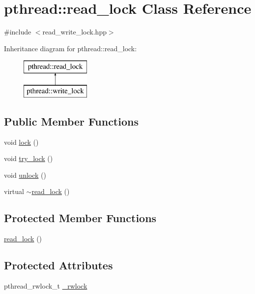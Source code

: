 \hypertarget{classpthread_1_1read__lock}{\section{pthread\+:\+:read\+\_\+lock Class Reference}
\label{classpthread_1_1read__lock}
}


{\ttfamily \#include $<$read\+\_\+write\+\_\+lock.\+hpp$>$}

Inheritance diagram for pthread\+:\+:read\+\_\+lock\+:\begin{figure}[H]
\begin{center}
\leavevmode
\includegraphics[height=2.000000cm]{classpthread_1_1read__lock}
\end{center}
\end{figure}
\subsection*{Public Member Functions}
\begin{DoxyCompactItemize}
\item 
void \hyperlink{classpthread_1_1read__lock_aa779f486f67e7d44638b14b15d0ababb}{lock} ()
\item 
void \hyperlink{classpthread_1_1read__lock_a978298bd5a0812f6440dae48e41a7f6a}{try\+\_\+lock} ()
\item 
void \hyperlink{classpthread_1_1read__lock_a429cb28d1e45efae6390824b5b2025f1}{unlock} ()
\item 
virtual \hyperlink{classpthread_1_1read__lock_a6da67e03d719c2f2a303e3034728c8a7}{$\sim$read\+\_\+lock} ()
\end{DoxyCompactItemize}
\subsection*{Protected Member Functions}
\begin{DoxyCompactItemize}
\item 
\hyperlink{classpthread_1_1read__lock_aca7a4cc9026a6fd4b7403e0413dcff73}{read\+\_\+lock} ()
\end{DoxyCompactItemize}
\subsection*{Protected Attributes}
\begin{DoxyCompactItemize}
\item 
pthread\+\_\+rwlock\+\_\+t \hyperlink{classpthread_1_1read__lock_af63582bfd9518cf6e5a081fd39b25f68}{\+\_\+rwlock}
\end{DoxyCompactItemize}


